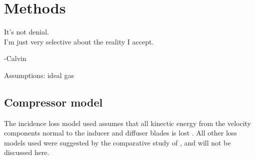 \documentclass[tcc]{subfiles}
\begin{document}


\chapter{Methods}
\label{sec:methods}
\epigraph{It's not denial. \\ I'm just very selective about the reality I accept.}{-Calvin}
Assumptions: ideal gas
\section{Compressor model}

The incidence loss model used assumes that all kinectic energy from the velocity components
normal to the inducer and diffuser blades is lost \cite{Stanitz1953}.
All other loss models used were suggested by the comparative study of \textcite{Oh1997}, 
and will not be discussed here.
\end{document}
